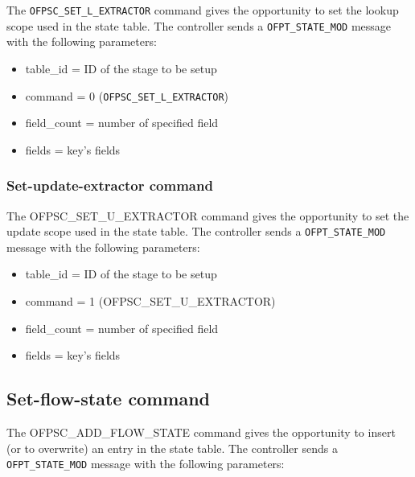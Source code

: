 The \texttt{OFPSC\_SET\_L\_EXTRACTOR} command gives the opportunity to set the lookup scope used in the state table.
The controller sends a \texttt{OFPT\_STATE\_MOD} message with the following parameters:

\begin{itemize}
\item table\_id = ID of the stage to be setup
\item command = 0 (\texttt{OFPSC\_SET\_L\_EXTRACTOR})
\item field\_count = number of specified field 
\item fields = key’s fields
\end{itemize}


\subsubsection{Set-update-extractor command}
\label{subsec:set_u_extr}

The OFPSC\_SET\_U\_EXTRACTOR command gives the opportunity to set the update scope used in the state table.
The controller sends a \texttt{OFPT\_STATE\_MOD} message with the following parameters:

\begin{itemize}
\item table\_id = ID of the stage to be setup
\item command = 1 (OFPSC\_SET\_U\_EXTRACTOR)
\item field\_count = number of specified field 
\item fields = key’s fields
\end{itemize}


\subsection{Set-flow-state command}
\label{subsec:add_flow}

The OFPSC\_ADD\_FLOW\_STATE command gives the opportunity to insert (or to overwrite) an entry in the state table.
The controller sends a \texttt{OFPT\_STATE\_MOD} message with the following parameters:

